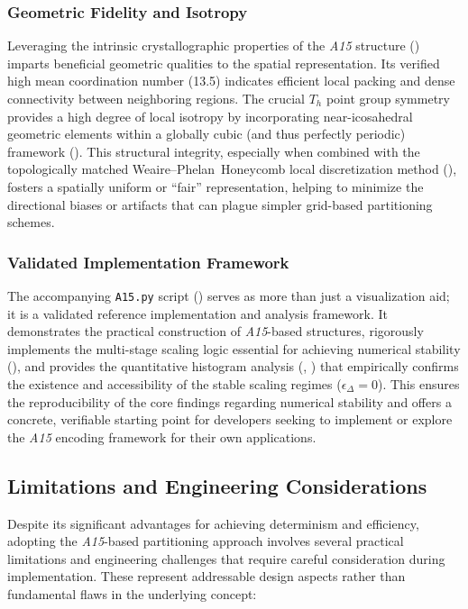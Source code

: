 \documentclass[10pt]{article}
\def\AAAB{\textit{A15}}
\def\WP{Weaire--Phelan}
\def\WPH{\WP{}~Honeycomb}
\begin{document}
\subsubsection{Geometric Fidelity and Isotropy}\label{subsubsec-benefits-geometry}
Leveraging the intrinsic crystallographic properties of the \AAAB{} structure () imparts beneficial geometric qualities to the spatial representation. Its verified high mean coordination number (13.5) indicates efficient local packing and dense connectivity between neighboring regions. The crucial $T_h$ point group symmetry provides a high degree of local isotropy by incorporating near-icosahedral geometric elements within a globally cubic (and thus perfectly periodic) framework (). This structural integrity, especially when combined with the topologically matched \WPH{} local discretization method (), fosters a spatially uniform or ``fair'' representation, helping to minimize the directional biases or artifacts that can plague simpler grid-based partitioning schemes.

\subsubsection{Validated Implementation Framework}\label{subsubsec-benefits-validation}
The accompanying \texttt{A15.py} script () serves as more than just a visualization aid; it is a validated reference implementation and analysis framework. It demonstrates the practical construction of \AAAB{}-based structures, rigorously implements the multi-stage scaling logic essential for achieving numerical stability (), and provides the quantitative histogram analysis (, ) that empirically confirms the existence and accessibility of the stable scaling regimes ($\epsilon_\Delta = 0$). This ensures the reproducibility of the core findings regarding numerical stability and offers a concrete, verifiable starting point for developers seeking to implement or explore the \AAAB{} encoding framework for their own applications.

\subsection{Limitations and Engineering Considerations}\label{subsec-discussion-limits}

Despite its significant advantages for achieving determinism and efficiency, adopting the \AAAB{}-based partitioning approach involves several practical limitations and engineering challenges that require careful consideration during implementation. These represent addressable design aspects rather than fundamental flaws in the underlying concept:
\end{document}
